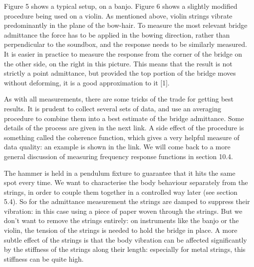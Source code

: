 
  Figure 5 shows a typical setup, on a banjo. Figure 6 shows a slightly 
  modified procedure being used on a violin. As mentioned above, violin strings 
  vibrate predominantly in the plane of the bow-hair. To measure the most 
  relevant bridge admittance the force has to be applied in the bowing 
  direction, rather than perpendicular to the soundbox, and the response needs 
  to be similarly measured. It is easier in practice to measure the response 
  from the corner of the bridge on the other side, on the right in this 
  picture. This means that the result is not strictly a point admittance, but 
  provided the top portion of the bridge moves without deforming, it is a good 
  approximation to it [1]. 


  As with all measurements, there are some tricks of the trade for getting best 
  results. It is prudent to collect several sets of data, and use an averaging 
  procedure to combine them into a best estimate of the bridge admittance. Some 
  details of the process are given in the next link. A side effect of the 
  procedure is something called the coherence function, which gives a very 
  helpful measure of data quality: an example is shown in the link. We will 
  come back to a more general discussion of measuring frequency response 
  functions in section 10.4. 

  The hammer is held in a pendulum fixture to guarantee that it hits the same 
  spot every time. We want to characterise the body behaviour separately from 
  the strings, in order to couple them together in a controlled way later (see 
  section 5.4). So for the admittance measurement the strings are damped to 
  suppress their vibration: in this case using a piece of paper woven through 
  the strings. But we don't want to remove the strings entirely: on instruments 
  like the banjo or the violin, the tension of the strings is needed to hold 
  the bridge in place. A more subtle effect of the strings is that the body 
  vibration can be affected significantly by the stiffness of the strings along 
  their length: especially for metal strings, this stiffness can be quite high. 

